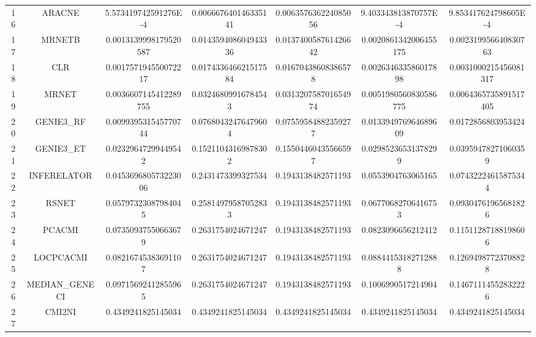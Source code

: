 \documentclass[a4paper,10pt]{article}
\begin{document}
\begin{landscape}
\begin{table}[!htp]
\begin{tabular}{ccccccc}
16&ARACNE&5.573419742591276E-4&0.006667640146335141&0.006357636224085056&9.403343813870757E-4&9.853417624798605E-4\\
17&MRNETB&0.0013139998179520587&0.014359408604943336&0.013740058761426642&0.0020861342006455175&0.002319956640830763\\
18&CLR&0.001757194550072217&0.017433646621517584&0.01670438608386578&0.002634633586017898&0.0031000215456081317\\
19&MRNET&0.0036607145412289755&0.03246809916784543&0.031320758701654974&0.0051980560830586775&0.0064365735891517405\\
20&GENIE3_RF&0.009939531545770744&0.07680432476479604&0.07559584882359277&0.013394976964689609&0.0172856803953424\\
21&GENIE3_ET&0.02329647299449542&0.15211043169878302&0.15504460435566597&0.02985236531378299&0.03959478271060359\\
22&INFERELATOR&0.045369680573223006&0.2431473399327534&0.1943138482571193&0.0553904763065165&0.07432224615875344\\
23&RSNET&0.05797323087984045&0.25814979587052833&0.1943138482571193&0.06770682706416753&0.09304761965681826\\
24&PCACMI&0.07350937550663679&0.2631754024671247&0.1943138482571193&0.0823096656212412&0.11511287188198606\\
25&LOCPCACMI&0.08216745383691107&0.2631754024671247&0.1943138482571193&0.08844153182712888&0.12694987723708828\\
26&MEDIAN_GENECI&0.09715692412855965&0.2631754024671247&0.1943138482571193&0.1006990517214904&0.14671114552832226\\
27&CMI2NI&0.4349241825145034&0.4349241825145034&0.4349241825145034&0.4349241825145034&0.4349241825145034\\
\hline
\end{tabular}
\end{table}


\newpage


\end{landscape}
\end{document}

